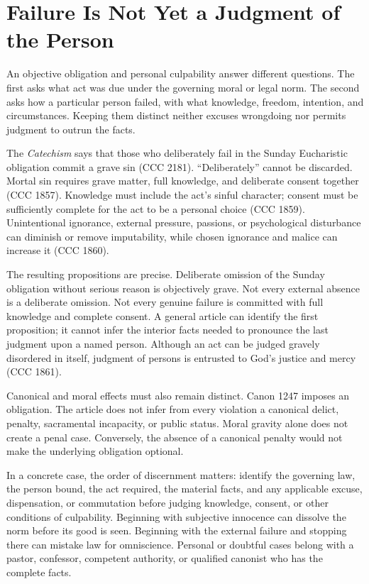 \section{Failure Is Not Yet a Judgment of the Person}

An objective obligation and personal culpability answer different questions. The first asks what act was due under the governing moral or legal norm. The second asks how a particular person failed, with what knowledge, freedom, intention, and circumstances. Keeping them distinct neither excuses wrongdoing nor permits judgment to outrun the facts.

The \emph{Catechism} says that those who deliberately fail in the Sunday Eucharistic obligation commit a grave sin (CCC 2181). ``Deliberately'' cannot be discarded. Mortal sin requires grave matter, full knowledge, and deliberate consent together (CCC 1857). Knowledge must include the act's sinful character; consent must be sufficiently complete for the act to be a personal choice (CCC 1859). Unintentional ignorance, external pressure, passions, or psychological disturbance can diminish or remove imputability, while chosen ignorance and malice can increase it (CCC 1860).

The resulting propositions are precise. Deliberate omission of the Sunday obligation without serious reason is objectively grave. Not every external absence is a deliberate omission. Not every genuine failure is committed with full knowledge and complete consent. A general article can identify the first proposition; it cannot infer the interior facts needed to pronounce the last judgment upon a named person. Although an act can be judged gravely disordered in itself, judgment of persons is entrusted to God's justice and mercy (CCC 1861).

Canonical and moral effects must also remain distinct. Canon 1247 imposes an obligation. The article does not infer from every violation a canonical delict, penalty, sacramental incapacity, or public status. Moral gravity alone does not create a penal case. Conversely, the absence of a canonical penalty would not make the underlying obligation optional.

In a concrete case, the order of discernment matters: identify the governing law, the person bound, the act required, the material facts, and any applicable excuse, dispensation, or commutation before judging knowledge, consent, or other conditions of culpability. Beginning with subjective innocence can dissolve the norm before its good is seen. Beginning with the external failure and stopping there can mistake law for omniscience. Personal or doubtful cases belong with a pastor, confessor, competent authority, or qualified canonist who has the complete facts.

